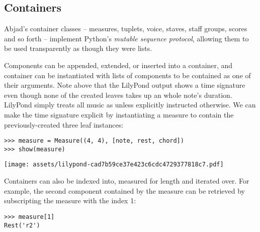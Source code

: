 \subsection{Containers}
\label{ssec:containers}

Abjad's container classes -- measures, tuplets, voice, staves, staff groups,
scores and so forth -- implement Python's \emph{mutable sequence protocol},
allowing them to be used transparently as though they were lists.

Components can be appended, extended, or inserted into a container, and
container can be instantiated with lists of components to be contained as one
of their arguments. Note above that the LilyPond output shows a 
time signature even though none of the created leaves takes up an whole note's
duration. LilyPond simply treats all music as  unless explicitly
instructed otherwise. We can make the  time signature explicit by
instantiating a  measure to contain the previously-created three
leaf instances:

\begin{comment}
<abjad>
measure = Measure((4, 4), [note, rest, chord])
show(measure)
</abjad>
\end{comment}

\begin{abjadbookoutput}
\begin{singlespacing}
\vspace{-0.5\baselineskip}
\begin{lstlisting}
>>> measure = Measure((4, 4), [note, rest, chord])
>>> show(measure)
\end{lstlisting}
\noindent\texttt{[image: assets/lilypond-cad7b59ce37e423c6cdc4729377818c7.pdf]}
\end{singlespacing}
\end{abjadbookoutput}

\noindent Containers can also be indexed into, measured for length and iterated
over. For example, the second component contained by the measure can be
retrieved by subscripting the measure with the index 1:

\begin{comment}
<abjad>
measure[1]
</abjad>
\end{comment}

\begin{abjadbookoutput}
\begin{singlespacing}
\vspace{-0.5\baselineskip}
\begin{lstlisting}
>>> measure[1]
Rest('r2')
\end{lstlisting}
\end{singlespacing}
\end{abjadbookoutput}


